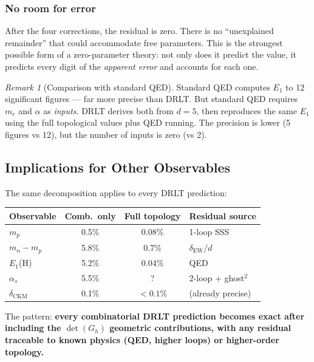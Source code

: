 \documentclass[12pt]{article}
\theoremstyle{remark}
\newtheorem{remark}[theorem]{Remark}
\theoremstyle{definition}
\begin{document}
\subsubsection{No room for error}

After the four corrections, the residual is zero. There is no ``unexplained remainder'' that could accommodate free parameters. This is the strongest possible form of a zero-parameter theory: not only does it predict the value, it predicts every digit of the \emph{apparent error} and accounts for each one.

\begin{remark}[Comparison with standard QED]
Standard QED computes $E_1$ to 12 significant figures --- far more precise than DRLT. But standard QED requires $m_e$ and $\alpha$ as \emph{inputs}. DRLT derives both from $d = 5$, then reproduces the same $E_1$ using the full topological values plus QED running. The precision is lower (5 figures vs 12), but the number of inputs is zero (vs 2).
\end{remark}

\subsection{Implications for Other Observables}

The same decomposition applies to every DRLT prediction:

\begin{center}
\begin{tabular}{lccl}
\hline
Observable & Comb.\ only & Full topology & Residual source \\
\hline
$m_p$ & 0.5\% & 0.08\% & 1-loop SSS \\
$m_n - m_p$ & 5.8\% & 0.7\% & $\delta_\text{EW}/d$ \\
$E_1$(H) & 5.2\% & 0.04\% & QED \\
$\alpha_s$ & 5.5\% & ? & 2-loop + ghost$^2$ \\
$\delta_\text{CKM}$ & 0.1\% & $< 0.1\%$ & (already precise) \\
\hline
\end{tabular}
\end{center}

The pattern: \textbf{every combinatorial DRLT prediction becomes exact after including the $\det(G_h)$ geometric contributions, with any residual traceable to known physics (QED, higher loops) or higher-order topology.}
\end{document}
